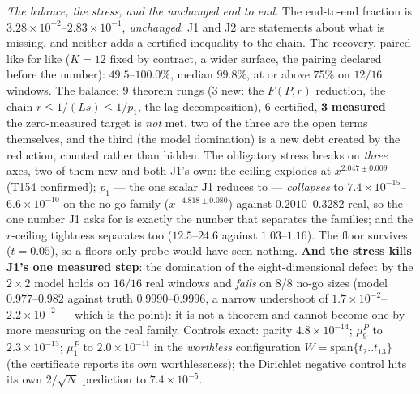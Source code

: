 \documentclass[11pt,a4paper]{article}
\begin{document}
\emph{The balance, the stress, and the unchanged end to end.} The end-to-end fraction is
$3.28\times10^{-2}$--$2.83\times10^{-1}$, \emph{unchanged}: J1 and J2 are statements about
what is missing, and neither adds a certified inequality to the chain. The recovery,
paired like for like ($K=12$ fixed by contract, a wider surface, the pairing declared
before the number): $49.5$--$100.0\%$, median $99.8\%$, at or above $75\%$ on $12/16$
windows. The balance: $9$ theorem rungs ($3$ new: the $F(P,r)$ reduction, the chain
$r\le1/(Ls)\le1/p_1$, the lag decomposition), $6$ certified, $\mathbf{3}$
\textbf{measured} --- the zero-measured target is \emph{not} met, two of the three are the
open terms themselves, and the third (the model domination) is a new debt created by the
reduction, counted rather than hidden. The obligatory stress breaks on \emph{three} axes,
two of them new and both J1's own: the ceiling explodes at $x^{2.047\pm0.009}$ (T154
confirmed); $p_1$ --- the one scalar J1 reduces to --- \emph{collapses} to
$7.4\times10^{-15}$--$6.6\times10^{-10}$ on the no-go family ($x^{-4.818\pm0.080}$)
against $0.2010$--$0.3282$ real, so the one number J1 asks for is exactly the number that
separates the families; and the $r$-ceiling tightness separates too ($12.5$--$24.6$
against $1.03$--$1.16$). The floor survives ($t=0.05$), so a floors-only probe would have
seen nothing. \textbf{And the stress kills J1's one measured step}: the domination of the
eight-dimensional defect by the $2\times2$ model holds on $16/16$ real windows and
\emph{fails} on $8/8$ no-go sizes (model $0.977$--$0.982$ against truth
$0.9990$--$0.9996$, a narrow undershoot of $1.7\times10^{-2}$--$2.2\times10^{-2}$ ---
which is the point): it is not a theorem and cannot become one by more measuring on the
real family. Controls exact: parity $4.8\times10^{-14}$; $\mu^P_9$ to
$2.3\times10^{-13}$; $\mu^P_1$ to $2.0\times10^{-11}$ in the \emph{worthless}
configuration $W=\mathrm{span}\{t_2..t_{13}\}$ (the certificate reports its own
worthlessness); the Dirichlet negative control hits its own $2/\sqrt N$ prediction to
$7.4\times10^{-5}$.
\end{document}
